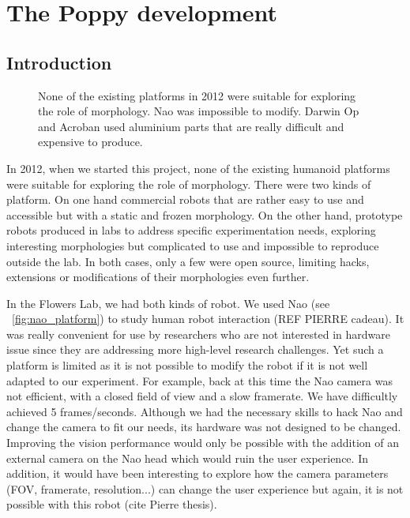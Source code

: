 
\cleartoleftpage

\chapter{The Poppy development} %


\section{Introduction} %

\begin{figure}[tb]
\centering
    \hfil
    \hfil
    \caption{None of the existing platforms in 2012 were suitable for exploring the role of morphology. Nao was impossible to modify. Darwin Op and Acroban used aluminium parts that are really difficult and expensive to produce.}
    \label{fig:2012_Humanoids}
\end{figure}

In 2012, when we started this project, none of the existing humanoid platforms were suitable for exploring the role of morphology. There were two kinds of platform. On one hand commercial robots that are rather easy to use and accessible but with a static and frozen morphology. On the other hand, prototype robots produced in labs to address specific experimentation needs, exploring interesting morphologies but complicated to use and impossible to reproduce outside the lab. In both cases, only a few were open source, limiting hacks, extensions or modifications of their morphologies even further.


In the Flowers Lab, we had both kinds of robot. We used Nao (see \figurename~\ref{fig:nao_platform}) to study human robot interaction (REF PIERRE cadeau). It was really convenient for use by researchers who are not interested in hardware issue since they are addressing more high-level research challenges. Yet such a platform is limited as it is not possible to modify the robot if it is not well adapted to our experiment. For example, back at this time the Nao camera was not efficient, with a closed field of view and a slow framerate. We have difficultly achieved 5 frames/seconds. Although we had the necessary skills to hack Nao and change the camera to fit our needs, its hardware was not designed to be changed. Improving the vision performance would only be possible with the addition of an external camera on the Nao head which would ruin the user experience. In addition, it would have been interesting to explore how the camera parameters (FOV, framerate, resolution...) can change the user experience but again, it is not possible with this robot (cite Pierre thesis).


